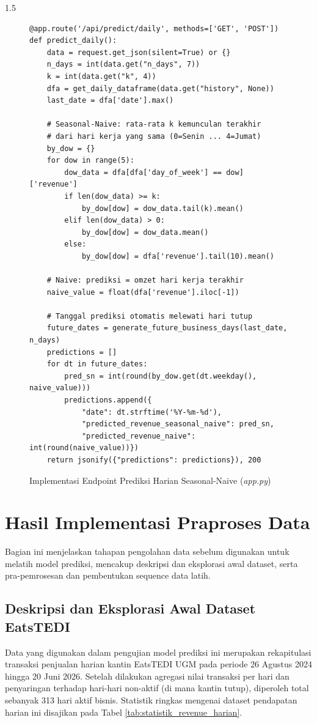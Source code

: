 \documentclass[12pt, a4paper, onecolumn, oneside]{report}
\begin{document}
\begin{spacing}{1.5}
\begin{figure}[H]
\begin{lstlisting}
@app.route('/api/predict/daily', methods=['GET', 'POST'])
def predict_daily():
    data = request.get_json(silent=True) or {}
    n_days = int(data.get("n_days", 7))
    k = int(data.get("k", 4))
    dfa = get_daily_dataframe(data.get("history", None))
    last_date = dfa['date'].max()

    # Seasonal-Naive: rata-rata k kemunculan terakhir
    # dari hari kerja yang sama (0=Senin ... 4=Jumat)
    by_dow = {}
    for dow in range(5):
        dow_data = dfa[dfa['day_of_week'] == dow]['revenue']
        if len(dow_data) >= k:
            by_dow[dow] = dow_data.tail(k).mean()
        elif len(dow_data) > 0:
            by_dow[dow] = dow_data.mean()
        else:
            by_dow[dow] = dfa['revenue'].tail(10).mean()

    # Naive: prediksi = omzet hari kerja terakhir
    naive_value = float(dfa['revenue'].iloc[-1])

    # Tanggal prediksi otomatis melewati hari tutup
    future_dates = generate_future_business_days(last_date, n_days)
    predictions = []
    for dt in future_dates:
        pred_sn = int(round(by_dow.get(dt.weekday(), naive_value)))
        predictions.append({
            "date": dt.strftime('%Y-%m-%d'),
            "predicted_revenue_seasonal_naive": pred_sn,
            "predicted_revenue_naive": int(round(naive_value))})
    return jsonify({"predictions": predictions}), 200
\end{lstlisting}
\caption{Implementasi Endpoint Prediksi Harian Seasonal-Naive (\textit{app.py})}
\label{fig:flask_daily}
\end{figure}

\section{Hasil Implementasi Praproses Data}

Bagian ini menjelaskan tahapan pengolahan data sebelum digunakan untuk melatih model prediksi, mencakup deskripsi dan eksplorasi awal dataset, serta pra-pemrosesan dan pembentukan sequence data latih.

\subsection{Deskripsi dan Eksplorasi Awal Dataset EatsTEDI}

Data yang digunakan dalam pengujian model prediksi ini merupakan rekapitulasi transaksi penjualan harian kantin EatsTEDI UGM pada periode 26 Agustus 2024 hingga 20 Juni 2026. Setelah dilakukan agregasi nilai transaksi per hari dan penyaringan terhadap hari-hari non-aktif (di mana kantin tutup), diperoleh total sebanyak 313 hari aktif bisnis. Statistik ringkas mengenai dataset pendapatan harian ini disajikan pada Tabel \ref{tab:statistik_revenue_harian}.


\end{spacing}
\end{document}

